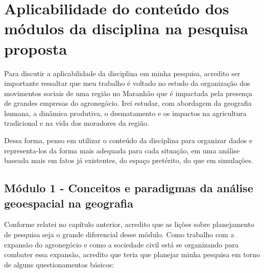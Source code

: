 \section{Aplicabilidade do conteúdo dos módulos da disciplina na pesquisa proposta}

Para discutir a aplicabilidade da disciplina em minha pesquisa, acredito ser importante ressaltar que meu trabalho é voltado no estudo da organização dos movimentos sociais de uma região no Maranhão que é impactada pela presença de grandes empresas do agronegócio. Irei estudar, com abordagem da geografia humana, a dinâmica produtiva, o desmatamento e os impactos na agricultura tradicional e na vida dos moradores da região. 

Dessa forma, penso em utilizar o conteúdo da disciplina para organizar dados e representa-los da forma mais adequada para cada situação, em uma análise baseada mais em fatos já existentes, do espaço pretérito, do que em simulações.


\subsection{Módulo 1 - Conceitos e paradigmas da análise geoespacial na geografia}

Conforme relatei no capítulo anterior, acredito que as lições sobre planejamento de pesquisa seja o grande diferencial desse módulo. Como trabalho com a expansão do agronegócio e como a sociedade civil está se organizando para combater essa expansão, acredito que teria que planejar minha pesquisa em torno de alguns questionamentos básicos:

